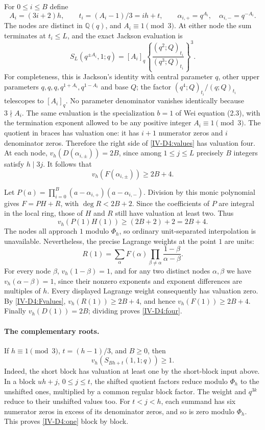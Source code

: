 \documentclass[11pt,letterpaper]{article}
\numberwithin{equation}{section}
\begin{document}
For $0\le i\le B$ define
\[
 A_i=(3i+2)h,\qquad t_i=(A_i-1)/3=ih+t,
 \qquad \alpha_{i,+}=q^{A_i},\quad\alpha_{i,-}=q^{-A_i}.
\]
The nodes are distinct in $\mathbb Q(q)$, and $A_i\equiv1\pmod3$.
At either node the sum terminates at $t_i\le L$, and the exact
Jackson evaluation is
\begin{equation}\label{IV-D4:values}
 S_L(q^{\pm A_i},1;q)
 =[A_i]_q\left\{\frac{(q^2;Q)_{t_i}}{(q^3;Q)_{t_i}}\right\}^{3}.
\end{equation}
For completeness, this is Jackson's identity with central parameter
$q$, other upper parameters $q,q,q,q^{1+A_i},q^{1-A_i}$ and
base $Q$; the factor $(q^4;Q)_{t_i}/(q;Q)_{t_i}$ telescopes
to $[A_i]_q$.  No parameter denominator vanishes identically
because $3\nmid A_i$.  The same evaluation is the specialization
$b=1$ of Wei equation (2.3), with the termination exponent
allowed to be any positive integer $A_i\equiv1\pmod3$.
The quotient in braces has valuation one: it has $i+1$
numerator zeros and $i$ denominator zeros.  Therefore the
right side of \eqref{IV-D4:values} has valuation four.
At each node, $v_h(D(\alpha_{i,\pm}))=2B$, since among
$1\le j\le L$ precisely $B$ integers satisfy $h\mid3j$.
It follows that
\begin{equation}\label{IV-D4:Fvalues}
 v_h(F(\alpha_{i,\pm}))\ge2B+4.
\end{equation}

Let $P(a)=\prod_{i=0}^B(a-\alpha_{i,+})(a-\alpha_{i,-})$.
Division by this monic polynomial gives $F=PH+R$, with
$\deg R<2B+2$.  Since the coefficients of $P$ are integral
in the local ring, those of $H$ and $R$ still have valuation
at least two.  Thus
\[
 v_h(P(1)H(1))\ge(2B+2)+2=2B+4.
\]
The nodes all approach $1$ modulo $\Phi_h$, so ordinary
unit-separated interpolation is unavailable.  Nevertheless,
the precise Lagrange weights at the point $1$ are units:
\[
 R(1)=\sum_{\alpha}F(\alpha)
       \prod_{\beta\ne\alpha}\frac{1-\beta}{\alpha-\beta}.
\]
For every node $\beta$, $v_h(1-\beta)=1$, and for any two
distinct nodes $\alpha,\beta$ we have
$v_h(\alpha-\beta)=1$, since their nonzero exponents and
exponent differences are multiples of $h$.
Every displayed Lagrange weight consequently has valuation
zero.  By \eqref{IV-D4:Fvalues}, $v_h(R(1))\ge2B+4$, and hence
$v_h(F(1))\ge2B+4$.  Finally $v_h(D(1))=2B$; dividing proves
\eqref{IV-D4:four}.

\paragraph{The complementary roots.}
If $h\equiv1\pmod3$, $t=(h-1)/3$, and $B\ge0$, then
\begin{equation}\label{IV-D4:one}
 v_h(S_{Bh+t}(1,1;q))\ge1.
\end{equation}
Indeed, the short block has valuation at least one by the
short-block input above.  In a block $uh+j$, $0\le j\le t$,
the shifted quotient factors reduce modulo $\Phi_h$ to the
unshifted ones, multiplied by a common regular block factor.
The weight and $q^{3k}$ reduce to their unshifted values too.
For $t<j<h$, each summand has six numerator zeros in excess
of its denominator zeros, and so is zero modulo $\Phi_h$.
This proves \eqref{IV-D4:one} block by block.
\end{document}
